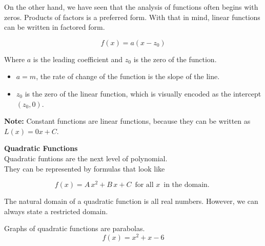 \documentclass{ximera}
\begin{document}
On the other hand, we have seen that the analysis of functions often begins with zeros.  Products of factors is a preferred form.  With that in mind, linear functions can be written in factored form.


\[  f(x) = a (x - z_0)  \]

Where $a$ is the leading coefficient and $z_0$ is the zero of the function.





\begin{itemize}

\item $a = m$, the rate of change of the function is the slope of the line.

\item $z_0$ is the zero of the linear function, which is visually encoded as the intercept $(z_0, 0)$.

\end{itemize}



\textbf{Note:} Constant functions are linear functions, because they can be written as $L(x) = 0 x + C$. \\












\begin{template}  \textbf{\textcolor{blue!55!black}{Quadratic Functions}} \\



Quadratic funtions are the next level of polynomial. \\


They can be represented by formulas that look like


\[ f(x) = A \, x^2 + B \, x + C  \,  \text{ for all } x  \, \text{ in the domain. }   \]



\end{template}



The natural domain of a quadratic function is all real numbers.  However, we can always state a restricted domain.







Graphs of quadratic functions are parabolas. 
\[ f(x) = x^2 + x - 6\]
\end{document}
